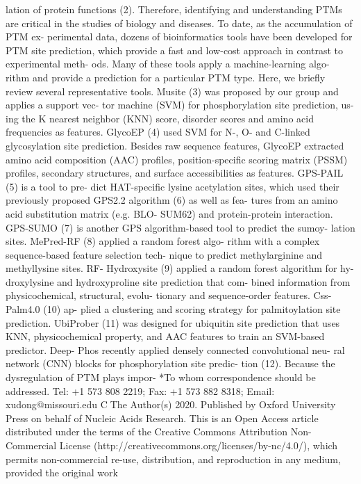 lation of protein functions (2). Therefore, identifying and
understanding PTMs are critical in the studies of biology
and diseases. To date, as the accumulation of PTM ex-
perimental data, dozens of bioinformatics tools have been
developed for PTM site prediction, which provide a fast
and low-cost approach in contrast to experimental meth-
ods. Many of these tools apply a machine-learning algo-
rithm and provide a prediction for a particular PTM type.
Here, we briefly review several representative tools. Musite
(3) was proposed by our group and applies a support vec-
tor machine (SVM) for phosphorylation site prediction, us-
ing the K nearest neighbor (KNN) score, disorder scores
and amino acid frequencies as features. GlycoEP (4) used
SVM for N-, O- and C-linked glycosylation site prediction.
Besides raw sequence features, GlycoEP extracted amino
acid composition (AAC) profiles, position-specific scoring
matrix (PSSM) profiles, secondary structures, and surface
accessibilities as features. GPS-PAIL (5) is a tool to pre-
dict HAT-specific lysine acetylation sites, which used their
previously proposed GPS2.2 algorithm (6) as well as fea-
tures from an amino acid substitution matrix (e.g. BLO-
SUM62) and protein-protein interaction. GPS-SUMO (7)
is another GPS algorithm-based tool to predict the sumoy-
lation sites. MePred-RF (8) applied a random forest algo-
rithm with a complex sequence-based feature selection tech-
nique to predict methylarginine and methyllysine sites. RF-
Hydroxysite (9) applied a random forest algorithm for hy-
droxylysine and hydroxyproline site prediction that com-
bined information from physicochemical, structural, evolu-
tionary and sequence-order features. Css-Palm4.0 (10) ap-
plied a clustering and scoring strategy for palmitoylation
site prediction. UbiProber (11) was designed for ubiquitin
site prediction that uses KNN, physicochemical property,
and AAC features to train an SVM-based predictor. Deep-
Phos recently applied densely connected convolutional neu-
ral network (CNN) blocks for phosphorylation site predic-
tion (12). Because the dysregulation of PTM plays impor-
*To whom correspondence should be addressed. Tel: +1 573 808 2219; Fax: +1 573 882 8318; Email: xudong@missouri.edu
C⃝The Author(s) 2020. Published by Oxford University Press on behalf of Nucleic Acids Research.
This is an Open Access article distributed under the terms of the Creative Commons Attribution Non-Commercial License
(http://creativecommons.org/licenses/by-nc/4.0/), which permits non-commercial re-use, distribution, and reproduction in any medium, provided the original work

